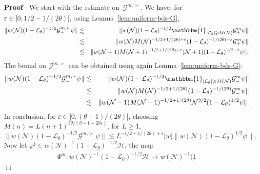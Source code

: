 \documentclass{article}
\newenvironment{proof}{\noindent\textbf{Proof\ }}{\hspace*{\fill}$\Box$\medskip}
\begin{document}
\begin{proof}
  We start with the estimate on~$\mathcal{G}_+^{m, \succ}$. We have, for
  $\varepsilon \in] 0, 1 / 2 - 1 / (2 \theta) [$, using
  Lemma~\ref{lem:uniform-bds-G},
  \begin{eqnarray*}
    \| w (\mathcal{N}) (1 -\mathcal{L}_{\theta})^{- 1 / 2} \mathcal{G}_+^{m,
    \succ} \psi \| & \lesssim & \| w (\mathcal{N}) (1
    -\mathcal{L}_{\theta})^{- 1 / 2} \mathbbm{1}_{| \mathcal{L}_{\theta} |
    \geqslant M (\mathcal{N})}^{} \mathcal{G}_+^m \psi \|\\
    & \lesssim & \| w (\mathcal{N}) M (\mathcal{N})^{- 1 / 2 + 1 / (2 \theta)
    + \varepsilon} (1 -\mathcal{L}_{\theta})^{- 1 / (2 \theta) - \varepsilon}
    \mathcal{G}_+^m \psi \|\\
    & \lesssim & \| w (\mathcal{N}+ 1) M (\mathcal{N}+ 1)^{- 1 / 2 + 1 / (2
    \theta) + \varepsilon} (\mathcal{N}+ 1) (1 -\mathcal{L}_{\theta})^{1 / 2 -
    \varepsilon} \psi \| .
  \end{eqnarray*}
  The bound on $\mathcal{G}_-^{m, \succ}$ can be obtained using again
  Lemma~\ref{lem:uniform-bds-G}:
  \begin{eqnarray*}
    \| w (\mathcal{N}) (1 -\mathcal{L}_{\theta})^{- 1 / 2} \mathcal{G}_-^{m,
    \succ} \psi \| & \lesssim & \| w (\mathcal{N}) (1
    -\mathcal{L}_{\theta})^{- 1 / 2} \mathbbm{1}_{| \mathcal{L}_{\theta} |
    \geqslant M (\mathcal{N})}^{} \mathcal{G}_-^m \psi \|\\
    & \lesssim & \| w (\mathcal{N}) M (\mathcal{N})^{- 1 / 2 + 1 / (2
    \theta)} (1 -\mathcal{L}_{\theta})^{- 1 / (2 \theta)} \mathcal{G}_-^m \psi
    \|\\
    & \lesssim & \| w (\mathcal{N}- 1) M (\mathcal{N}- 1)^{- 1 / 2 + 1 / (2
    \theta)} \mathcal{N}^{3 / 2} (1 -\mathcal{L}_{\theta})^{1 / 2} \psi \| .
  \end{eqnarray*}
  In conclusion, for $\varepsilon \in] 0, (\theta - 1) / (2 \theta) [$,
  choosing $M (n) = L (n + 1)^{3 \theta / (\theta - 1 - 2 \theta
  \varepsilon)}$, for $L \geqslant 1$,
  \[ \| w (\mathcal{N}) (1 -\mathcal{L}_{\theta})^{- 1 / 2} \mathcal{G}^{m,
     \succ} \psi \| \lesssim L^{- 1 / 2 + 1 / (2 \theta) + \varepsilon} | w |
     \| w (\mathcal{N}) (1 -\mathcal{L}_{\theta})^{1 / 2} \psi \| . \]
  Now let $\varphi^{\sharp} \in w (\mathcal{N})^{- 1} (1
  -\mathcal{L}_{\theta})^{- 1 / 2} \mathcal{H}$, the map
  \[ \begin{array}{c}
       \Psi^m : w (\mathcal{N})^{- 1} (1 -\mathcal{L}_{\theta})^{- 1 / 2}
       \mathcal{H} \rightarrow w (\mathcal{N})^{- 1} (1

\end{array}\]
\end{proof}
\end{document}
